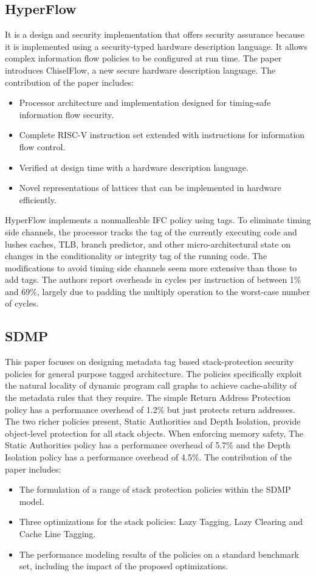 \subsection{HyperFlow \cite{HyperFlow}} 
It is a design and security implementation that offers security assurance because it is implemented 
using a security-typed hardware description language. It allows complex information flow policies to 
be configured at run time. The paper introduces ChiselFlow, a new secure hardware description language. 
The contribution of the paper includes: 
\begin{itemize}
  \item Processor architecture and implementation designed for timing-safe information flow security. 
  \item Complete RISC-V instruction set extended with instructions for information flow control. 
  \item Verified at design time with a hardware description language. 
  \item Novel representations of lattices that can be implemented in hardware efficiently. 
\end{itemize}
HyperFlow implements a nonmalleable IFC policy using tags.
To eliminate timing side channels, the processor tracks the tag of the currently executing code and lushes caches,
TLB, branch predictor, and other micro-architectural state on changes in the conditionality or integrity tag of the
running code. The modifications to avoid timing side channels seem more extensive than those to add tags. The
authors report overheads in cycles per instruction of between 1\% and 69\%, largely due to padding the multiply
operation to the worst-case number of cycles.

\subsection{SDMP \cite{Sdmp}}
This paper focuses on designing metadata tag based stack-protection security policies for general purpose tagged
architecture. The policies specifically
exploit the natural locality of dynamic program call graphs to
achieve cache-ability of the metadata rules that they require.
The simple Return Address Protection policy has a performance
overhead of 1.2\% but just protects return addresses.
The two richer policies present, Static Authorities and Depth Isolation, 
provide object-level protection for all stack objects. When
enforcing memory safety, The Static Authorities policy has a
performance overhead of 5.7\% and the Depth Isolation policy
has a performance overhead of 4.5\%.
The contribution of the paper includes:
\begin{itemize}
  \item The formulation of a range of stack protection policies
within the SDMP model.
  \item Three optimizations for the stack policies: Lazy Tagging,
Lazy Clearing and Cache Line Tagging.
  \item The performance modeling results of the policies on
a standard benchmark set, including the impact of the
proposed optimizations.
\end{itemize}  

